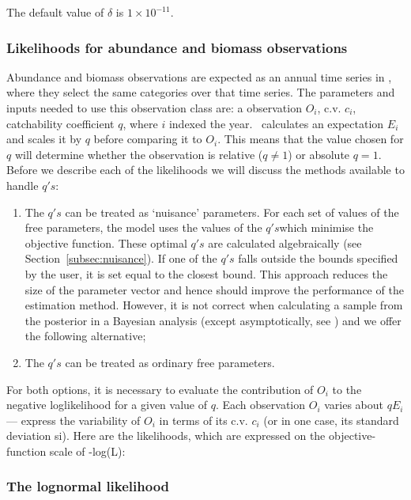 {{{{The default value of $\delta$ is $1 \times 10^{-11}$.

\subsubsection{Likelihoods for abundance and biomass observations}\label{Obs:biomass}
Abundance and biomass observations are expected as an annual time series in \CNAME, where they select the same categories over that time series. The parameters and inputs needed to use this observation class are: a observation $O_i$, c.v. $c_i$, catchability coefficient $q$, where $i$ indexed the year. \CNAME\ calculates an expectation $E_i$ and scales it by $q$ before comparing it to $O_i$. This means that the value chosen for $q$ will determine whether the observation is relative ($q\neq 1$) or absolute $q = 1$. Before we describe each of the likelihoods we will discuss the methods available to handle $q's$:

\begin{enumerate}
	\item The $q's$ can be treated as ‘nuisance’ parameters. For each set of values of the free parameters, the model uses the values of the $q's$which minimise the objective function. These optimal $q's$ are calculated algebraically (see Section~\ref{subsec:nuisance}). If one of the $q's$ falls outside the bounds specified by the user, it is set equal to the closest bound. This approach reduces the size of the parameter vector and hence should improve the performance of the estimation method. However, it is not correct when calculating a sample from the posterior in a Bayesian analysis (except asymptotically, see \cite{Walters_ludwig_94}) and we offer the following alternative;
	
	\item The $q's$ can be treated as ordinary free parameters.
\end{enumerate}	
	
For both options, it is necessary to evaluate the contribution of $O_i$ to the negative loglikelihood for a given value of $q$. Each observation $O_i$ varies about $qE_i$ — express the variability of $O_i$ in terms of its c.v. $c_i$ (or in one case, its standard deviation si). Here are the likelihoods, which are expressed on the objective-function scale of -log(L):


\subsubsection*{The lognormal likelihood}

}}}}
